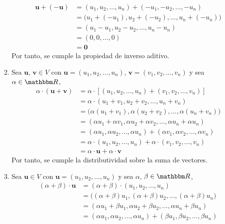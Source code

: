 \begin{examplebox}{}{}
\begin{enumerate}[label=\roman*), topsep=6pt, itemsep=0pt]
        \begin{align*}
            \mathbf{u} + (-\mathbf{u}) & = (u_1, u_2, \dots, u_n) + (-u_1, -u_2, \dots, -u_n) \\
            & = \big(u_1 + (-u_1), u_2 + (-u_2), \dots, u_n + (-u_n) \big) \\
            & = (u_1 - u_1, u_2 - u_2, \dots, u_n - u_n) \\
            & = (0, 0, \dots, 0) \\
            & = \mathbf{0}
        \end{align*}
        Por tanto, se cumple la propiedad de inverso aditivo.
        \item Sea $\mathbf{u}$, $\mathbf{v} \in V$ con $\mathbf{u} = (u_1, u_2, \dots, u_n)$, $\mathbf{v} = (v_1, v_2, \dots, v_n)$ y sea $\alpha \in \RR$,
        \begin{align*}
            \alpha \cdot (\mathbf{u} + \mathbf{v}) & = \alpha \cdot [(u_1, u_2, \dots, u_n) + (v_1, v_2, \dots, v_n)] \\
            & = \alpha \cdot (u_1 + v_1, u_2 + v_2, \dots, u_n + v_n) \\
            & = \big( \alpha(u_1 + v_1), \alpha(u_2 + v_2), \dots, \alpha(u_n + v_n) \big) \\
            & = (\alpha u_1 + \alpha v_1, \alpha u_2 + \alpha v_2, \dots, \alpha u_n + \alpha u_n) \\
            & = (\alpha u_1, \alpha u_2, \dots, \alpha u_n) + (\alpha v_1, \alpha v_2, \dots, \alpha v_n) \\
            & = \alpha \cdot (u_1, u_2, \dots, u_n) + \alpha \cdot (v_1, v_2, \dots, v_n) \\
            & = \alpha \cdot \mathbf{u} + \alpha \cdot \mathbf{v}
        \end{align*}
        Por tanto, se cumple la distributividad sobre la suma de vectores.
        \item Sea $\mathbf{u} \in V$ con $\mathbf{u} = (u_1, u_2, \dots, u_n)$ y sea $\alpha$, $\beta \in \RR$,
        \begin{align*}
            (\alpha + \beta) \cdot \mathbf{u} & = (\alpha + \beta) \cdot (u_1, u_2, \dots, u_n) \\
            & = \big( (\alpha + \beta)u_1, (\alpha + \beta)u_2, \dots, (\alpha + \beta)u_n \big) \\
            & = (\alpha u_1 + \beta u_1, \alpha u_2 + \beta u_2, \dots, \alpha u_n + \beta u_n) \\
            & = (\alpha u_1, \alpha u_2, \dots, \alpha u_n) + (\beta u_1, \beta u_2, \dots, \beta u_n) \\

\end{align*}
\end{enumerate}
\end{examplebox}
